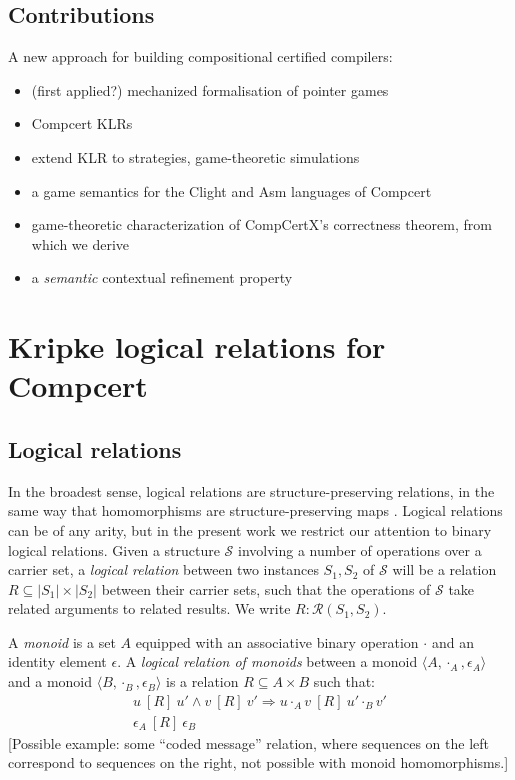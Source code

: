 \documentclass[sigplan,10pt,review,anonymous]{acmart}
\newcommand{\ifr}[1]{\ [{#1}]\ }
\begin{document}
\subsection{Contributions}

A new approach for building compositional certified compilers:
\begin{itemize}
\item (first applied?) mechanized formalisation of pointer games
\item Compcert KLRs
\item extend KLR to strategies, game-theoretic simulations
\item a game semantics for the Clight and Asm languages of Compcert
\item game-theoretic characterization of CompCertX's correctness theorem, from which we derive
\item a \emph{semantic} contextual refinement property
\end{itemize}


\section{Kripke logical relations for Compcert} %


\subsection{Logical relations} %

In the broadest sense,
logical relations are structure-preserving relations,
in the same way that homomorphisms are structure-preserving maps
\citep{lrp}.
Logical relations can be of any arity,
but in the present work
we restrict our attention to
binary logical relations.
Given a structure $\mathcal{S}$
involving a number of operations over a carrier set,
a \emph{logical relation}
between two instances $S_1, S_2$ of $\mathcal{S}$
will be a relation $R \subseteq |S_1| \times |S_2|$
between their carrier sets,
such that the operations of $\mathcal{S}$
take related arguments to related results.
We write $R : \mathcal{R}(S_1, S_2)$.

\begin{example}
\label{ex:monoid}
A \emph{monoid} is a set $A$ equipped with
an associative binary operation $\cdot$ and
an identity element $\epsilon$.
A \emph{logical relation of monoids} between
a monoid $\langle A, \cdot_A, \epsilon_A \rangle$ and
a monoid $\langle B, \cdot_B, \epsilon_B \rangle$
is a relation $R \subseteq A \times B$
such that:
\begin{gather*}
u \ifr{R} u' \wedge v \ifr{R} v' \Rightarrow u \cdot_A v \ifr{R} u' \cdot_B v' \\
\epsilon_A \ifr{R} \epsilon_B
\end{gather*}
[Possible example: some ``coded message'' relation,
where sequences on the left correspond to sequences on the right,
not possible with monoid homomorphisms.]
\end{example}
\end{document}
